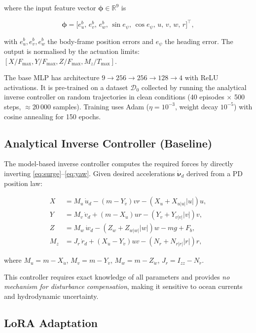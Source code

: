 \documentclass[journal]{IEEEtran}
\newcommand{\R}{\mathbb{R}}
\newcommand{\bnu}{\bm{\nu}}
\begin{document}
where the input feature vector $\bm{\phi} \in \R^9$ is

\begin{equation}
  \bm{\phi} = \bigl[e_u^b,\, e_v^b,\, e_w^b,\, \sin e_\psi,\, \cos e_\psi,\,
                    u,\, v,\, w,\, r\bigr]^{\top},
  \label{eq:features}
\end{equation}

with $e_u^b, e_v^b, e_w^b$ the body-frame position errors and $e_\psi$ the
heading error. The output is normalised by the actuation limits:
$[X/F_{\max}, Y/F_{\max}, Z/F_{\max}, M_z/T_{\max}]$.

The base MLP has architecture $9 \to 256 \to 256 \to 128 \to 4$ with ReLU
activations. It is pre-trained on a dataset $\mathcal{D}_0$ collected by
running the analytical inverse controller on random trajectories in clean
conditions (40 episodes $\times$ 500 steps, $\approx$20\,000 samples).
Training uses Adam ($\eta=10^{-3}$, weight decay $10^{-5}$) with cosine
annealing for 150 epochs.

\subsection{Analytical Inverse Controller (Baseline)}

The model-based inverse controller computes the required forces by
directly inverting \eqref{eq:surge}--\eqref{eq:yaw}. Given desired
accelerations $\dot{\bnu}_d$ derived from a PD position law:

\begin{align}
  X   &= M_u\, \dot{u}_d - (m{-}Y_{\dot{v}})vr - (X_u + X_{u|u|}|u|)u,\\
  Y   &= M_v\, \dot{v}_d + (m{-}X_{\dot{u}})ur - (Y_v + Y_{v|v|}|v|)v,\\
  Z   &= M_w\, \dot{w}_d - (Z_w + Z_{w|w|}|w|)w - mg + F_b,\\
  M_z &= J_r\, \dot{r}_d + (X_{\dot{u}}{-}Y_{\dot{v}})uv - (N_r + N_{r|r|}|r|)r,
\end{align}

where $M_u = m - X_{\dot{u}}$, $M_v = m - Y_{\dot{v}}$,
$M_w = m - Z_{\dot{w}}$, $J_r = I_{zz} - N_{\dot{r}}$.

This controller requires exact knowledge of all parameters and provides
\emph{no mechanism for disturbance compensation}, making it sensitive to
ocean currents and hydrodynamic uncertainty.

\subsection{LoRA Adaptation}
\end{document}
